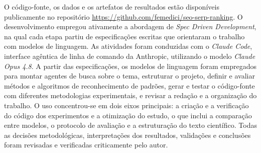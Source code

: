 \documentclass[12pt]{article}
\begin{document}
O código-fonte, os dados e os artefatos de resultados estão disponíveis publicamente no repositório
\url{https://github.com/femedici/seo-serp-ranking}. O desenvolvimento empregou ativamente a
abordagem de \textit{Spec Driven Development}, na qual cada etapa partiu de especificações escritas
que orientaram o trabalho com modelos de linguagem. As atividades foram conduzidas com o
\textit{Claude Code}, interface agêntica de linha de comando da Anthropic, utilizando o modelo
\textit{Claude Opus 4.8}. A partir das especificações, os modelos de linguagem foram empregados para
montar agentes de busca sobre o tema, estruturar o projeto, definir e avaliar métodos e algoritmos
de reconhecimento de padrões, gerar e testar o código-fonte com diferentes metodologias
experimentais, e revisar a redação e a organização do trabalho. O uso concentrou-se em dois eixos
principais: a criação e a verificação do código dos experimentos e a otimização do estudo, o que
inclui a comparação entre modelos, o protocolo de avaliação e a estruturação do texto científico.
Todas as decisões metodológicas, interpretações dos resultados, validações e conclusões foram
revisadas e verificadas criticamente pelo autor.



\end{document}
